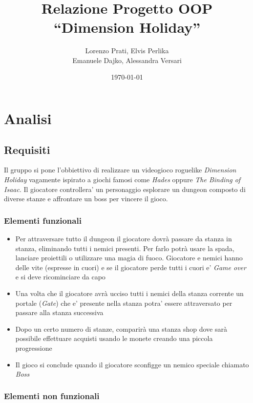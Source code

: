 \documentclass[a4paper,12pt]{report}
\title{Relazione Progetto OOP\\``Dimension Holiday''}
\author{Lorenzo Prati, Elvis Perlika\\ Emanuele Dajko, Alessandra Versari}
\date{\today}
\begin{document}
\maketitle

\tableofcontents

\chapter{Analisi}

\section{Requisiti}

Il gruppo si pone l'obbiettivo di realizzare un videogioco roguelike \textit{Dimension Holiday} vagamente ispirato a giochi famosi come \textit{Hades} oppure \textit{The Binding of Isaac}. Il giocatore controllera' un personaggio 
esplorare un dungeon composto di diverse stanze e affrontare un boss per vincere il gioco.

\subsection*{Elementi funzionali}

\begin{itemize}
	\item Per attraversare tutto il dungeon il giocatore dovrà passare da stanza in stanza,
	eliminando tutti i nemici presenti. Per farlo potrà usare la spada, lanciare
	proiettili o utilizzare una magia di fuoco. Giocatore e nemici hanno delle vite (espresse in cuori) e se il giocatore perde tutti i cuori e' \textit{Game over} e si deve ricominciare da capo
	\item Una volta che il giocatore avrà ucciso tutti i nemici della stanza corrente un portale (\textit{Gate}) che e' presente nella stanza potra' essere attraversato per passare alla stanza successiva
	\item Dopo un certo numero di stanze, comparirà una stanza shop
	dove sarà possibile effettuare acquisti usando le monete creando una piccola progressione
	\item Il gioco si conclude quando il giocatore sconfigge un nemico speciale chiamato \textit{Boss}
	
\end{itemize}

\subsection*{Elementi non funzionali}
\end{document}
